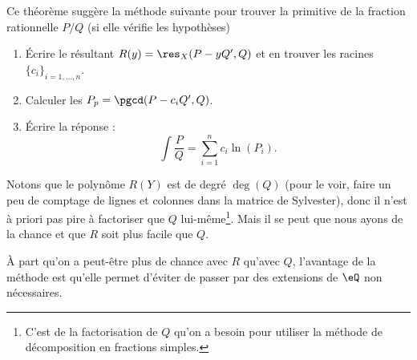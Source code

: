 Ce théorème suggère la méthode suivante pour trouver la primitive de la fraction rationnelle \( P/Q\) (si elle vérifie les hypothèses)
\begin{enumerate}
	\item
	      Écrire le résultant \( R(y)=\res_X(P-yQ',Q)\) et en trouver les racines \( \{ c_i \}_{i=1,\ldots, n}\).
	\item
	      Calculer les \( P_p=\pgcd(P-c_iQ',Q)\).
	\item
	      Écrire la réponse :
	      \begin{equation}
		      \int\frac{ P }{ Q }=\sum_{i=1}^nc_i\ln(P_i).
	      \end{equation}
\end{enumerate}

Notons que le polynôme \( R(Y)\) est de degré \( \deg(Q)\) (pour le voir, faire un peu de comptage de lignes et colonnes dans la matrice de Sylvester), donc il n'est à priori pas pire à factoriser que \( Q\) lui-même\footnote{C'est de la factorisation de \( Q\) qu'on a besoin pour utiliser la méthode de décomposition en fractions simples.}. Mais il se peut que nous ayons de la chance et que \( R\) soit plus facile que \( Q\).

À part qu'on a peut-être plus de chance avec \( R\) qu'avec \( Q\), l'avantage de la méthode est qu'elle permet d'éviter de passer par des extensions de \( \eQ\) non nécessaires.

